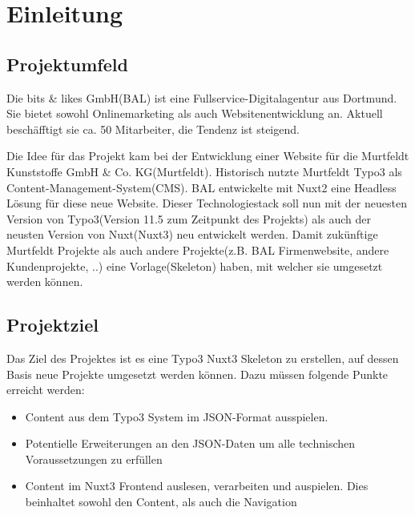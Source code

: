 \section{Einleitung}
\label{sec:Einleitung}


\subsection{Projektumfeld} 
\label{sec:Projektumfeld}
Die bits \& likes GmbH(\acs{BAL}) ist eine Fullservice-Digitalagentur aus Dortmund. Sie bietet sowohl Onlinemarketing als auch Websitenentwicklung an. Aktuell beschäfftigt sie ca. 50 Mitarbeiter, die Tendenz ist steigend.

Die Idee für das Projekt kam bei der Entwicklung einer Website für die Murtfeldt Kunststoffe GmbH \& Co. KG(Murtfeldt). Historisch nutzte Murtfeldt Typo3 als Content-Management-System(\acs{CMS}). \acs{BAL} entwickelte mit Nuxt2 eine Headless Lösung für diese neue Website. Dieser Technologiestack soll nun mit der neuesten Version von Typo3(Version 11.5 zum Zeitpunkt des Projekts) als auch der neusten Version von Nuxt(Nuxt3) neu entwickelt werden. Damit zukünftige Murtfeldt Projekte als auch andere Projekte(z.B. \acs{BAL} Firmenwebsite, andere Kundenprojekte, ..) eine Vorlage(Skeleton) haben, mit welcher sie umgesetzt werden können.


\subsection{Projektziel} 
\label{sec:Projektziel}
Das Ziel des Projektes ist es eine Typo3 Nuxt3 Skeleton zu erstellen, auf dessen Basis neue Projekte umgesetzt werden können. Dazu müssen folgende Punkte erreicht werden:
\begin{itemize}
	\item Content aus dem Typo3 System im JSON-Format ausspielen.
	\item Potentielle Erweiterungen an den JSON-Daten um alle technischen Voraussetzungen zu erfüllen
	\item Content im Nuxt3 Frontend auslesen, verarbeiten und auspielen. Dies beinhaltet sowohl den Content, als auch die Navigation
\end{itemize}


